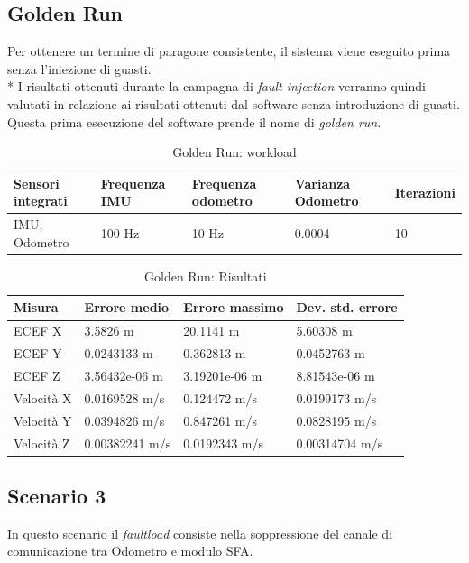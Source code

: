 \subsection{Golden Run}
Per ottenere un termine di paragone consistente, il sistema viene eseguito prima senza l'iniezione di guasti.\\*
I risultati ottenuti durante la campagna di \emph{fault injection} verranno quindi valutati in relazione ai risultati ottenuti dal software senza introduzione di guasti. Questa prima esecuzione del software prende il nome di \emph{golden run}.
\begin{table}[h]
	\centering
	\begin{tabular}{|p{3.25cm}|p{2cm}|p{2cm}|p{2cm}|p{2cm}|}
		\hline 
		\textbf{Sensori integrati} & \textbf{Frequenza IMU}  & \textbf{Frequenza odometro} & \textbf{Varianza Odometro} & \textbf{Iterazioni} \\ 
		\hline 
		IMU, Odometro & 100 Hz & 10 Hz & 0.0004 & 10 \\
		\hline 
	\end{tabular}
	\caption{Golden Run: workload}
	\label{tab:exp12}
\end{table}
\begin{table}[h]
	\centering
	\begin{tabular}{|p{2cm}|p{3cm}|p{3cm}|p{3cm}|}
		\hline 
		\textbf{Misura} & \textbf{Errore medio}  & \textbf{Errore massimo} & \textbf{Dev. std. errore}\\ 
		\hline 
		ECEF X & 3.5826 m & 20.1141 m & 5.60308 m \\ 
		\hline 
		ECEF Y & 0.0243133 m & 0.362813 m & 0.0452763 m \\ 
		\hline 
		ECEF Z & 3.56432e-06 m & 3.19201e-06 m & 8.81543e-06 m \\ 
		\hline 
		Velocit\`a X & 0.0169528 m/s & 0.124472 m/s & 0.0199173 m/s \\ 
		\hline 
		Velocit\`a Y & 0.0394826 m/s & 0.847261 m/s & 0.0828195 m/s \\ 
		\hline 
		Velocit\`a Z & 0.00382241 m/s & 0.0192343 m/s & 0.00314704 m/s \\ 
		\hline 
	\end{tabular}
	\caption{Golden Run: Risultati}
	\label{tab:exp12res}
\end{table}
\FloatBarrier
\subsection{Scenario 3}
In questo scenario il \emph{faultload} consiste nella soppressione del canale di comunicazione tra Odometro e modulo SFA.
